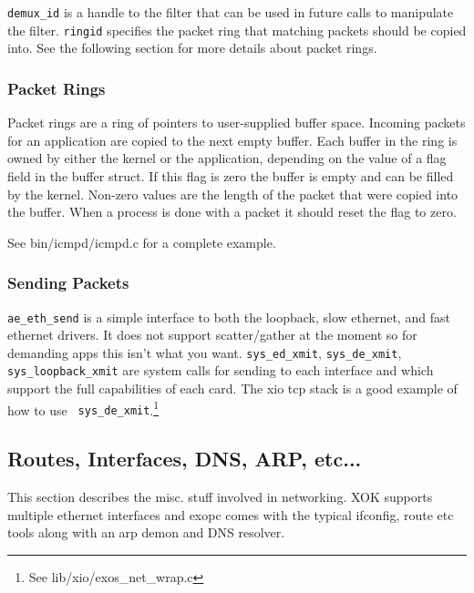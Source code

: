 {\tt demux\_id} is a handle to the filter that can be used in future calls
to manipulate the filter. {\tt ringid} specifies the packet ring that
matching packets should be copied into. See the following section for
more details about packet rings.

\subsubsection {Packet Rings}

Packet rings are a ring of pointers to user-supplied buffer
space. Incoming packets for an application are copied to the next
empty buffer. Each buffer in the ring is owned by either the kernel or
the application, depending on the value of a flag field in the buffer
struct. If this flag is zero the buffer is empty and can be filled by
the kernel. Non-zero values are the length of the packet that were
copied into the buffer. When a process is done with a packet it should
reset the flag to zero.

See bin/icmpd/icmpd.c for a complete example.

\subsubsection {Sending Packets}

{\tt ae\_eth\_send} is a simple interface to both the loopback, slow
ethernet, and fast ethernet drivers. It does not support
scatter/gather at the moment so for demanding apps this isn't what you
want. {\tt sys\_ed\_xmit}, {\tt sys\_de\_xmit}, {\tt
sys\_loopback\_xmit} are system calls for sending to each interface
and which support the full capabilities of each card. The xio tcp
stack is a good example of how to use {\tt
sys\_de\_xmit}.\footnote{See lib/xio/exos\_net\_wrap.c}

\subsection {Routes, Interfaces, DNS, ARP, etc...}

This section describes the misc. stuff involved in networking. XOK
supports multiple ethernet interfaces and exopc comes with the
typical ifconfig, route etc tools along with an arp demon and DNS
resolver.

